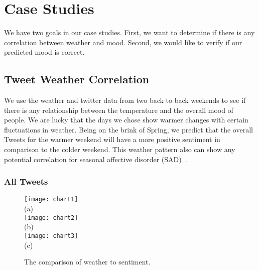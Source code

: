 \section{Case Studies}

We have two goals in our case studies. First, we want to determine if there is any correlation between weather and mood. Second, we would like to verify if our predicted mood is correct.

%


\subsection{Tweet Weather Correlation}

We use the weather and twitter data from two back to back weekends to see if there is any relationship between the temperature and the overall mood of people. We are lucky that the days we chose show warmer changes with certain fluctuations in weather. Being on the brink of Spring, we predict that the overall Tweets for the warmer weekend will have a more positive sentiment in comparison to the colder weekend. This weather pattern also can show any potential correlation for seasonal affective disorder (SAD)~\cite{denissen2008effects}.

\subsubsection{All Tweets}


\begin{figure}[t]
\begin{center}
\texttt{[image: chart1]} \\
\mbox{\small{(a)}}\\
\texttt{[image: chart2]} \\
\mbox{\small{(b)}}\\
\texttt{[image: chart3]} \\
\mbox{\small{(c)}} 
\end{center}
\vspace{-.1in}
\caption{The comparison of weather to sentiment.}
\label{fig:chart_1}
\end{figure}



